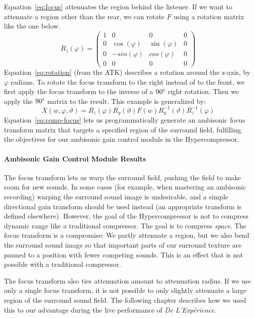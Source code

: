 Equation~\ref{eq:focus} attenuates the region behind the listener. 
If we want to attenuate a region other than the rear, we can rotate
$F$ using a rotation matrix like the one below.
\begin{equation}
R_z(\varphi)=\left( \begin{array}{cccc}
1 & 0 & 0 & 0 \\
0 & \cos(\varphi) & \sin(\varphi) & 0 \\
0 & -sin(\varphi) & cos(\varphi) & 0 \\
0 & 0 & 0 & 0
\end{array} \right)
\label{eq:rotation}
\end{equation}
Equation~\ref{eq:rotation} (from the ATK) describes a rotation around
the z-axis, by $\varphi$ radians. To rotate the focus transform to the
right instead of to the front, we first apply the focus transform to
the inverse of a $90\degree$ right rotation. Then we apply the
$90\degree$ matrix to the result. This example is generalized by:
\begin{equation}
X(w,\varphi,\vartheta)=R_z(\varphi)R_y(\vartheta)F(w) R_y^{-1}(\vartheta)R_z^{-1}(\varphi)
\label{eq:comp-focus}
\end{equation}
Equation~\ref{eq:comp-focus} lets us programmatically generate an
ambisonic focus transform matrix that targets a specified region of
the surround field, fulfilling the objectives for our ambisonic gain
control module in the Hypercompressor.

\paragraph{Ambisonic Gain Control Module Results}
The focus transform lets us warp the surround field, pushing the
field to make room for new sounds. In some cases (for example, when
mastering an ambisonic recording) warping the surround sound image is
undesirable, and a simple directional gain transform should be used
instead (an appropriate transform is defined
elsewhere\cite{Kronlachner2014i}). However, the goal of the
Hypercompressor is not to compress dynamic range like a traditional
compressor. The goal is to compress \emph{space}. The focus transform
is a compromise: We partly attenuate a region, but we also bend the
surround sound image so that important parts of our surround texture are
panned to a position with fewer competing sounds. This is an effect
that is not possible with a traditional compressor.

The focus transform also ties attenuation amount to attenuation
radius. If we use only a single focus transform, it is not possible to only
slightly attenuate a large region of the surround sound field. The
following chapter describes how we used this to our advantage
during the live performance of \textit{De L'Exp\'{e}rience}.

